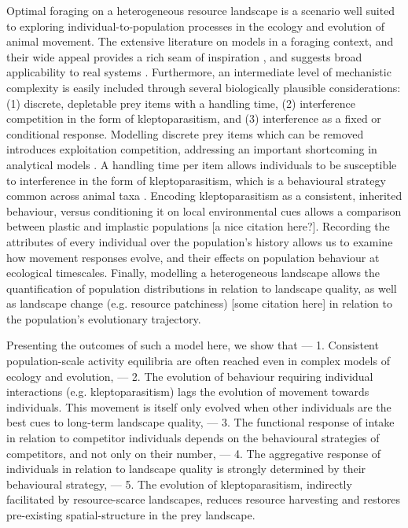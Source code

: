 \documentclass[11pt]{article}
\begin{document}
Optimal foraging on a heterogeneous resource landscape is a scenario well suited to exploring individual-to-population processes in the ecology and evolution of animal movement.
The extensive literature on models in a foraging context, and their wide appeal provides a rich seam of inspiration \citep{vahl2005,vahl2005a,tregenza1995,sutherland1996,bernstein1988,cressman2006,garay2015}, and suggests broad applicability to real systems \citep{stillman2010,sutherland1996}.
Furthermore, an intermediate level of mechanistic complexity is easily included through several biologically plausible considerations: (1) discrete, depletable prey items with a handling time, (2) interference competition in the form of kleptoparasitism, and (3) interference as a fixed or conditional response.
Modelling discrete prey items which can be removed introduces exploitation competition, addressing an important shortcoming in analytical models \citep[][]{fretwell1970,cressman2006,garay2015}.
A handling time per item allows individuals to be susceptible to interference in the form of kleptoparasitism, which is a behavioural strategy common across animal taxa \citep[][]{iyengar2008}.
Encoding kleptoparasitism as a consistent, inherited behaviour, versus conditioning it on local environmental cues allows a comparison between plastic and implastic populations [a nice citation here?].
Recording the attributes of every individual over the population's history allows us to examine how movement responses evolve, and their effects on population behaviour at ecological timescales.
Finally, modelling a heterogeneous landscape allows the quantification of population distributions in relation to landscape quality, as well as landscape change (e.g. resource patchiness) [some citation here] in relation to the population's evolutionary trajectory.

Presenting the outcomes of such a model here, we show that --- 1. Consistent population-scale activity equilibria are often reached even in complex models of ecology and evolution, --- 2. The evolution of behaviour requiring individual interactions (e.g. kleptoparasitism) lags the evolution of movement towards individuals. This movement is itself only evolved when other individuals are the best cues to long-term landscape quality, --- 3. The functional response of intake in relation to competitor individuals depends on the behavioural strategies of competitors, and not only on their number, --- 4. The aggregative response of individuals in relation to landscape quality is strongly determined by their behavioural strategy, --- 5. The evolution of kleptoparasitism, indirectly facilitated by resource-scarce landscapes, reduces resource harvesting and restores pre-existing spatial-structure in the prey landscape.
\end{document}
